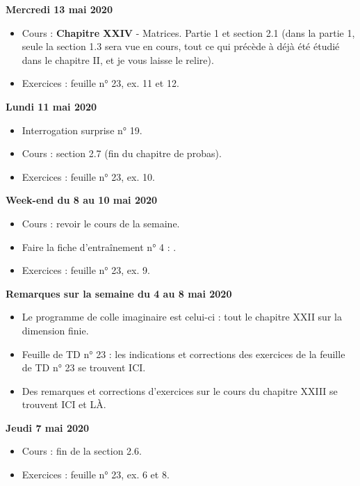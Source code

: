 \documentclass[12pt,a4paper]{article}
\begin{document}
\noindent\textbf{Mercredi 13 mai 2020}
\begin{itemize}
\item Cours : \textbf{Chapitre XXIV} - Matrices. Partie 1 et section 2.1 (dans la partie 1, seule la section 1.3 sera vue en cours, tout ce qui précède à déjà été étudié dans le chapitre II, et je vous laisse le relire).
\item Exercices : feuille n° 23, ex. 11 et 12.\vspace{.4cm}
\end{itemize}
 
\noindent\textbf{Lundi 11 mai 2020}
\begin{itemize}
\item Interrogation surprise n° 19.
\item Cours : section 2.7 (fin du chapitre de probas).
\item Exercices : feuille n° 23, ex. 10.\vspace{.4cm}
\end{itemize}

\noindent\textbf{Week-end du 8 au 10 mai 2020}
\begin{itemize}
\item Cours : revoir le cours de la semaine.
\item Faire la fiche d'entraînement n° 4 : .
\item Exercices : feuille n° 23, ex. 9.\vspace{.4cm}
\end{itemize}

\noindent\textbf{\bf Remarques sur la semaine du 4 au 8 mai 2020}
\begin{itemize}
\item Le programme de colle imaginaire est celui-ci : tout le chapitre XXII sur la dimension finie.
\item Feuille de TD n° 23 : les indications et corrections des exercices de la feuille de TD n° 23 se trouvent ICI.
\item Des remarques et corrections d'exercices sur le cours du chapitre XXIII se trouvent ICI et LÀ.\vspace{.4cm}
\end{itemize}
 
\noindent\textbf{Jeudi 7 mai 2020}
\begin{itemize}
\item Cours : fin de la section 2.6.
\item Exercices : feuille n° 23, ex. 6 et 8.\vspace{.4cm}
\end{itemize}
 
\end{document}
